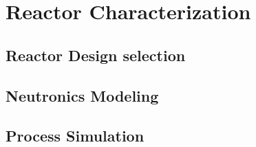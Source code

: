 \chapter{Reactor Characterization}
\label{Chapter:Modeling}

\section{Reactor Design selection}

\section{Neutronics Modeling}

\section{Process Simulation}